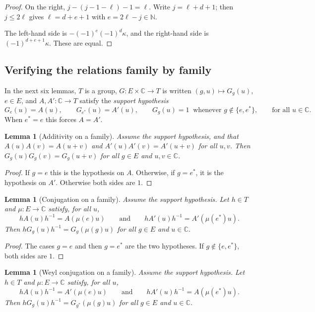 \documentclass[11pt]{article}
\newtheorem{lemma}[theorem]{Lemma}
\theoremstyle{definition}
\theoremstyle{remark}
\newcommand{\CC}{\mathbb{C}}
\newcommand{\NN}{\mathbb{N}}
\begin{document}
\begin{proof}
On the right, $j-(j-1-\ell)-1=\ell$. Write $j=\ell+d+1$; then $j\le2\ell$ gives $\ell=d+e+1$ with $e=2\ell-j\in\NN$.

The left-hand side is $-(-1)^{e}(-1)^{d}\kappa$, and the right-hand side is $(-1)^{d+e+1}\kappa$. These are equal.
\end{proof}

\subsection{Verifying the relations family by family}

In the next six lemmas, $T$ is a group, $G\colon E\times\CC\to T$ is written $(g,u)\mapsto G_g(u)$, $e\in E$, and $A,A'\colon\CC\to T$ satisfy the \emph{support hypothesis}
\[
G_e(u)=A(u),\qquad G_{e^\ast}(u)=A'(u),\qquad G_g(u)=1\ \text{ whenever } g\notin\{e,e^\ast\},\qquad\text{for all }u\in\CC .
\]
When $e^\ast=e$ this forces $A=A'$.

\begin{lemma}[Additivity on a family]\label{lem:gm_fam_add}
Assume the support hypothesis, and that $A(u)A(v)=A(u+v)$ and $A'(u)A'(v)=A'(u+v)$ for all $u,v$. Then $G_g(u)G_g(v)=G_g(u+v)$ for all $g\in E$ and $u,v\in\CC$.
\end{lemma}

\begin{proof}
If $g=e$ this is the hypothesis on $A$. Otherwise, if $g=e^\ast$, it is the hypothesis on $A'$. Otherwise both sides are $1$.
\end{proof}

\begin{lemma}[Conjugation on a family]\label{lem:gm_fam_conj}
Assume the support hypothesis. Let $h\in T$ and $\mu\colon E\to\CC$ satisfy, for all $u$,
\[
hA(u)h^{-1}=A(\mu(e)u)\qquad\text{and}\qquad hA'(u)h^{-1}=A'(\mu(e^\ast)u).
\]
Then $hG_g(u)h^{-1}=G_g(\mu(g)u)$ for all $g\in E$ and $u\in\CC$.
\end{lemma}

\begin{proof}
The cases $g=e$ and then $g=e^\ast$ are the two hypotheses. If $g\notin\{e,e^\ast\}$, both sides are $1$.
\end{proof}

\begin{lemma}[Weyl conjugation on a family]\label{lem:gm_fam_weyl}
Assume the support hypothesis. Let $h\in T$ and $\mu\colon E\to\CC$ satisfy, for all $u$,
\[
hA(u)h^{-1}=A'(\mu(e)u)\qquad\text{and}\qquad hA'(u)h^{-1}=A(\mu(e^\ast)u).
\]
Then $hG_g(u)h^{-1}=G_{g^\ast}(\mu(g)u)$ for all $g\in E$ and $u\in\CC$.
\end{lemma}
\end{document}
